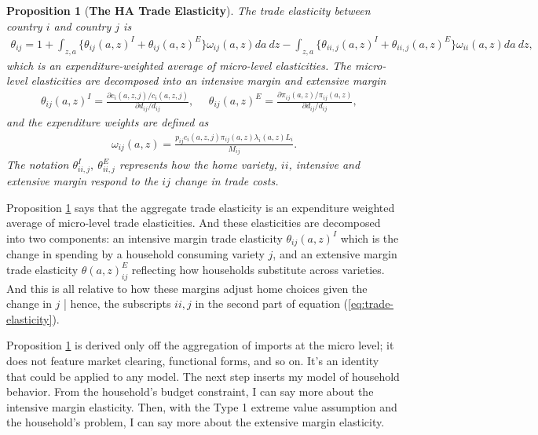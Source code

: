 \documentclass[12pt,pdftex]{article}
\newtheorem{prp}{Proposition}
\begin{document}
\begin{onehalfspacing}
\begin{prp}[\textbf{The HA Trade Elasticity}] \label{prp:GET} The trade elasticity between country $i$ and country $j$ is
{\footnotesize
\begin{align}
\theta_{ij} = 1 + \int_{z,a} \bigg \{ \theta_{ij}(a,z)^{I} + \theta_{ij}(a,z)^{E} \bigg \}\omega_{ij}(a,z)da \ dz - \int_{z,a} \bigg \{ \theta_{ii,j}(a,z)^{I} + \theta_{ii,j}(a,z)^{E} \bigg \}\omega_{ii}(a,z)da \ dz,
\label{eq:trade-elasticity}
\end{align}
}which is an expenditure-weighted average of micro-level elasticities. The micro-level elasticities are decomposed into an intensive margin and extensive margin
{\footnotesize
\begin{align}
\nonumber
\theta_{ij}(a,z)^{I} = \frac{\partial c_{i}(a,z,j)/ c_{i}(a,z,j)}{\partial d_{ij} / d_{ij}}, \ \ \ \ \ \ \theta_{ij}(a,z)^{E} = \frac{\partial \pi_{ij}(a,z) / \pi_{ij}(a,z)}{\partial d_{ij} / d_{ij}}, \ \ \ \
\end{align}
}
and the expenditure weights are defined as
{\footnotesize
\begin{align}
\nonumber
\omega_{ij}(a,z) = \frac{p_{ij}c_{i}(a,z,j)\pi_{ij}(a,z) \lambda_{i}(a,z) L_i}{M_{ij}}.
\end{align}
}The notation $\theta_{ii,j}^I,  \  \theta_{ii,j}^E $ represents how the home variety, $ii$, intensive and extensive margin respond to the $ij$ change in trade costs.
\end{prp}

Proposition \ref{prp:GET} says that the aggregate trade elasticity is an expenditure weighted average of micro-level trade elasticities. And these elasticities are decomposed into two components: an intensive margin trade elasticity $\theta_{ij}(a,z)^{I}$ which is the change in spending by a household consuming variety $j$, and an extensive margin trade elasticity $\theta(a,z)_{ij}^{E}$ reflecting how households substitute across varieties. And this is all relative to how these margins adjust home choices given the change in $j$ | hence, the subscripts $ii,j$ in the second part of equation (\ref{eq:trade-elasticity}).

Proposition \ref{prp:GET} is derived only off the aggregation of imports at the micro level; it does not feature market clearing, functional forms, and so on. It's an identity that could be applied to any model. The next step inserts my model of household behavior. From the household's budget constraint, I can say more about the intensive margin elasticity. Then, with the Type 1 extreme value assumption and the household's problem, I can say more about the extensive margin elasticity.


\end{onehalfspacing}
\end{document}
